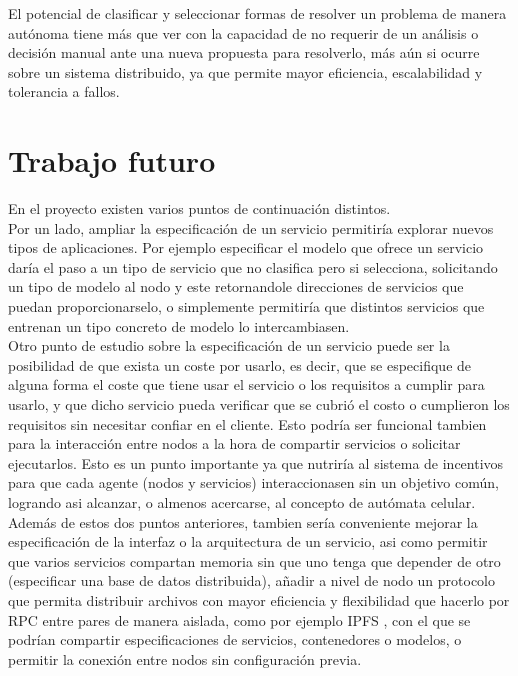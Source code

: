 \documentclass[11pt]{article}
\begin{document}
		El potencial de clasificar y seleccionar formas de resolver un problema de manera autónoma tiene más que ver con la capacidad de no requerir de 
		un análisis o decisión manual ante una nueva propuesta para resolverlo, más aún si ocurre sobre un sistema distribuido, ya que permite mayor eficiencia, escalabilidad y tolerancia a fallos. \\

	\section{Trabajo futuro}
		En el proyecto existen varios puntos de continuación distintos. \\
		Por un lado, ampliar la especificación de un servicio permitiría explorar nuevos tipos de aplicaciones. Por ejemplo 
		especificar el modelo que ofrece un servicio daría el paso a un tipo de servicio que no clasifica pero si selecciona, 
		solicitando un tipo de modelo al nodo y este retornandole direcciones de servicios que puedan proporcionarselo, o simplemente
		permitiría que distintos servicios que entrenan  un tipo concreto de modelo lo intercambiasen. \\
		
		Otro punto de estudio sobre la especificación de un servicio puede ser la posibilidad de que exista un coste por usarlo, es decir,
		que se especifique de alguna forma el coste que tiene usar el servicio o los requisitos a cumplir para usarlo, y que dicho servicio pueda verificar 
		que se cubrió el costo o cumplieron los requisitos sin necesitar confiar en el cliente. Esto podría ser funcional tambien para la interacción entre nodos
		a la hora de compartir servicios o solicitar ejecutarlos. Esto es un punto importante ya que nutriría al sistema de incentivos para que cada agente (nodos y
		servicios) interaccionasen sin un objetivo común, logrando asi alcanzar, o almenos acercarse, al concepto de autómata celular. \\

		Además de estos dos puntos anteriores, tambien sería conveniente mejorar la especificación de la interfaz o la arquitectura de un servicio, asi como permitir 
		que varios servicios compartan memoria sin que uno tenga que depender de otro (especificar una base de datos distribuida),
		añadir a nivel de nodo un protocolo que permita distribuir archivos con mayor eficiencia y flexibilidad que hacerlo por RPC entre pares
		de manera aislada, como por ejemplo IPFS \cite{ipfs}, con el que se podrían compartir especificaciones de servicios, contenedores o modelos, o permitir 
		la conexión entre nodos sin configuración previa. \\
\end{document}

